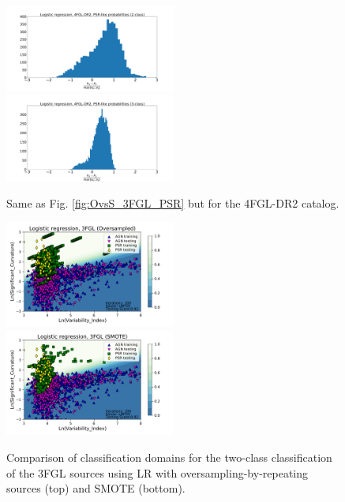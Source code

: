 \documentclass[referee]{aa} %
\begin{document}
\begin{appendix}
\begin{figure}[h!]
\centering
\includegraphics[width=0.5\textwidth]{plots/hist_diff_smote_LR_4FGL-DR2_2class.pdf}
\includegraphics[width=0.5\textwidth]{plots/hist_diff_smote_LR_4FGL-DR2_3class.pdf}
\caption{Same as Fig. \ref{fig:OvsS_3FGL_PSR} but for the 4FGL-DR2 catalog.
}
\label{fig:OvsS_4FGL_PSR}
\end{figure}

\begin{figure}[h!]
\centering
\includegraphics[width=0.5\textwidth]{plots/classification_domains/domains_oversampled_LR_3FGL_2class.pdf}
\includegraphics[width=0.5\textwidth]{plots/classification_domains/domains_smote_LR_3FGL_2class.pdf}
\caption{Comparison of classification domains for the two-class classification of the 3FGL sources
using LR with oversampling-by-repeating sources (top) and SMOTE (bottom).
}
\label{fig:domains_smote_over}
\end{figure}


\end{appendix}
\end{document}
